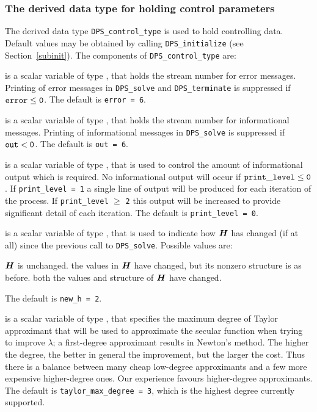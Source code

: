 \documentclass{galahad}
\newcommand{\packagename}{DPS}
\begin{document}

\subsubsection{The derived data type for holding control
 parameters}\label{typecontrol}
The derived data type
{\tt \packagename\_control\_type}
is used to hold controlling data. Default values may be obtained by calling
{\tt \packagename\_initialize}
(see Section~\ref{subinit}). The components of
{\tt \packagename\_control\_type}
are:

\begin{description}
 is a scalar variable of type \integer, that holds the
stream number for error messages.
Printing of error messages in
{\tt \packagename\_solve} and {\tt \packagename\_terminate}
is suppressed if ${\tt error} \leq {\tt 0}$.
The default is {\tt error = 6}.

 is a scalar variable of type \integer, that holds the
stream number for informational messages.
Printing of informational messages in
{\tt \packagename\_solve} is suppressed if ${\tt out} < {\tt 0}$.
The default is {\tt out = 6}.

 is a scalar variable of type \integer,
that is used
to control the amount of informational output which is required. No
informational output will occur if ${\tt print\_level} \leq {\tt 0}$. If
{\tt print\_level = 1} a single line of output will be produced for each
iteration of the process. If {\tt print\_level} $\geq$ {\tt 2} this output
will be increased to provide significant detail of each iteration.
The default is {\tt print\_level = 0}.

 is a scalar variable of type \integer, that is used
to indicate how ${\bm{H}}$ has changed (if at all) since the previous call
to {\tt \packagename\_solve}. Possible values are:
\begin{description}
 ${\bm{H}}$ is unchanged.
 the values in ${\bm{H}}$ have changed, but its nonzero structure
is as before.
 both the values and structure of ${\bm{H}}$ have changed.
\end{description}
The default is {\tt new\_h = 2}.

 is a scalar variable of type \integer,
that specifies the maximum degree of Taylor approximant that will be used
to approximate the secular function when trying to improve $\lambda$;
a first-degree approximant results in Newton's method.
The higher the degree, the better in general the improvement, but the larger the
cost. Thus there is a balance between many cheap low-degree approximants
and a few more expensive higher-degree ones. Our experience favours
higher-degree approximants.
The default is {\tt taylor\_max\_degree = 3}, which is the highest degree
currently supported.


\end{description}
\end{document}
